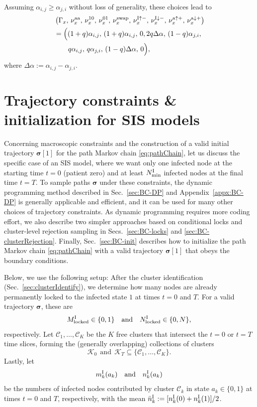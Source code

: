 \documentclass[english,10pt,aps,pra,twocolumn,superscriptaddress,floatfix,fleqn]{revtex4-2}
\newcommand{\mc}[1]{\mathcal{#1}}
\renewcommand{\vec}[1]{{\boldsymbol{#1}}}
\newcommand{\C} {\mc{C}}
\newcommand{\K} {\mc{K}}
\newcommand{\vs}{\vec{\sigma}}
\newcommand{\tI}{\textnormal{I}}
\newcommand{\ta}{\textnormal{a}}
\newcommand{\taa}{\textnormal{aa}}
\newcommand{\swap}{\textnormal{swap}}
\newcommand{\lock}{\textnormal{locked}}
\let\up\uparrow
\let\dw\downarrow
\begin{document}
Assuming $\alpha_{i,j}\geq\alpha_{j,i}$ without loss of generality, these choices lead to
\begin{align}\nonumber
	&\left(\Gamma_x,\, \nu^\taa_x,\, \nu^{10}_x,\, \nu^{01}_x,\, \nu^\swap_x,\, \nu^{\tI\up-}_x,\, \nu^{\tI\dw-}_x,\, \nu^{\ta\up+}_x,\, \nu^{\ta\dw+}_x\right)\\
	&\textstyle \nonumber
	=\Big((1+q)\alpha_{i,j},\, (1+q)\alpha_{i,j},\, 0, 2q\Delta\alpha,\, (1-q)\alpha_{j,i},\\
	& \qquad q\alpha_{i,j},\, q\alpha_{j,i},\, (1-q)\Delta\alpha,\, 0 \Big),
	\label{eq:SIS-E3-sol-q}
\end{align}
where $\Delta\alpha:=\alpha_{i,j}-\alpha_{j,i}$.


\section{Trajectory constraints \& initialization for SIS models}\label{sec:BC}
Concerning macroscopic constraints and the construction of a valid initial trajectory $\vs[1]$ for the path Markov chain \eqref{eq:pathChain}, let us discuss the specific case of an SIS model, where we want only one infected node at the starting time $t=0$ (patient zero) and at least $N^\tI_{\min}$ infected nodes at the final time $t=T$. To sample paths $\vs$ under these constraints, the dynamic programming method described in Sec.~\ref{sec:BC-DP} and Appendix~\ref{appx:BC-DP} is generally applicable and efficient, and it can be used for many other choices of trajectory constraints. As dynamic programming requires more coding effort, we also describe two simpler approaches based on conditional locks and cluster-level rejection sampling in Secs.~\ref{sec:BC-locks} and \ref{sec:BC-clusterRejection}. Finally, Sec.~\ref{sec:BC-init} describes how to initialize the path Markov chain \eqref{eq:pathChain} with a valid trajectory $\vs[1]$ that obeys the boundary conditions.

Below, we use the following setup: After the cluster identification (Sec.~\ref{sec:clusterIdentify}), we determine how many nodes are already permanently locked to the infected state $1$ at times $t=0$ and $T$. For a valid trajectory $\vs$, these are
\begin{equation}
	M^\tI_\lock\in\{0,1\}\quad\text{and}\quad
	N^\tI_\lock\in\{0,N\},
\end{equation}
respectively. Let $\C_1,\dotsc,\C_K$ be the $K$ free clusters that intersect the $t=0$ or $t=T$ time slices, forming the (generally overlapping) collections of clusters 
\begin{equation}
	\K_0\ \ \text{and}\ \ \K_T\subseteq\{\C_1,\dotsc,\C_K\}.
\end{equation}
Lastly, let
\begin{equation}
	m^\tI_k(a_k)\quad\text{and}\quad
	n^\tI_k(a_k)
\end{equation}
be the numbers of infected nodes contributed by cluster $\C_k$ in state $a_k\in\{0,1\}$ at times $t=0$ and $T$, respectively, with the mean $\bar{n}^\tI_k:=[n^\tI_k(0)+n^\tI_k(1)]/2$.
\end{document}
